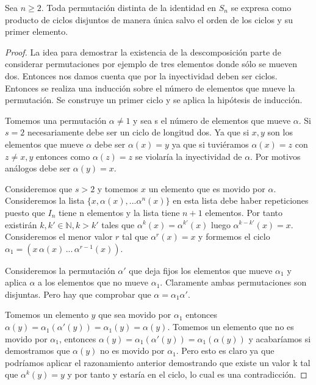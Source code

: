 \begin{nth}
Sea $n \ge 2$. Toda permutación distinta de la identidad en $S_n$ se expresa como producto de ciclos disjuntos de manera única salvo el orden de los ciclos y su primer elemento.
\end{nth}

\begin{proof}
La idea para demostrar la existencia de la descomposición parte de considerar permutaciones por ejemplo de tres elementos donde sólo se mueven dos. Entonces nos damos cuenta que por la inyectividad deben ser ciclos. Entonces se realiza una inducción sobre el número de elementos que mueve la permutación. Se construye un primer ciclo y se aplica la hipótesis de inducción.

Tomemos una permutación $\alpha \neq 1$ y sea s el número de elementos que mueve $\alpha$. Si $s = 2$ necesariamente debe ser un ciclo de longitud dos. Ya que si $x,y$ son los elementos que mueve $\alpha$ debe ser $\alpha(x) = y$ ya que si tuviéramos $\alpha(x) = z$ con $z \neq x,y$ entonces como $\alpha(z) = z$ se violaría la inyectividad de $\alpha$. Por motivos análogos debe ser $\alpha(y) = x$.

Consideremos que $s > 2$ y tomemos $x$ un elemento que es movido por $\alpha$. Consideremos la lista $\{x,\alpha(x),...\alpha^n(x)\}$ en esta lista debe haber repeticiones puesto que $I_n$ tiene n elementos y la lista tiene $n+1$ elementos. Por tanto existirán $k,k' \in \mathbb{N}, k > k'$ tales que $\alpha^{k}(x) = \alpha^{k'}(x)$ luego $\alpha^{k-k'}(x) = x$. Consideremos el menor valor $r$ tal que $\alpha^r(x) = x$ y formemos el ciclo $\alpha_1 = (x \, \alpha(x) \, ...  \, \alpha^{r-1}(x))$.

Consideremos la permutación $\alpha'$ que deja fijos los elementos que mueve $\alpha_1$ y aplica $\alpha$ a los elementos que no mueve $\alpha_1$. Claramente  ambas permutaciones son disjuntas. Pero hay que comprobar que $\alpha = \alpha_1 \alpha'$.

Tomemos un elemento $y$ que sea movido por $\alpha_1$ entonces $\alpha(y) = \alpha_1(\alpha'(y)) = \alpha_1(y) = \alpha(y)$. Tomemos un elemento que no es movido por $\alpha_1$, entonces $\alpha(y) = \alpha_1(\alpha'(y)) = \alpha_1(\alpha(y))$ y acabaríamos si demostramos que $\alpha(y)$ no es movido por $\alpha_1$. Pero esto es claro ya que podríamos aplicar el razonamiento anterior demostrando que existe un valor k tal que $\alpha^k(y) = y$ y por tanto y estaría en el ciclo, lo cual es una contradicción.


\end{proof}
